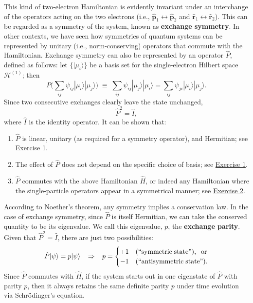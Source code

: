 \documentclass[pra,12pt]{revtex4}
\begin{document}
This kind of two-electron Hamiltonian is evidently invariant under an
interchange of the operators acting on the two electrons (i.e.,
$\hat{\mathbf{p}}_1 \leftrightarrow \hat{\mathbf{p}}_2$ and
$\hat{\mathbf{r}}_1 \leftrightarrow \hat{\mathbf{r}}_2$).  This can be
regarded as a symmetry of the system, known as \textbf{exchange
  symmetry}.  In other contexts, we have seen how symmetries of
quantum systems can be represented by unitary (i.e., norm-conserving)
operators that commute with the Hamiltonian.  Exchange symmetry can
also be represented by an operator $\hat{P}$, defined as follows: let
$\{|\mu_i\rangle\}$ be a basis set for the single-electron Hilbert
space $\mathscr{H}^{(1)}$; then
$$P \Big (\sum_{ij} \psi_{ij} |\mu_i\rangle|\mu_j\rangle \Big)
\;\equiv\;  \sum_{ij} \psi_{ij} |\mu_j\rangle|\mu_i\rangle = \sum_{ij} \psi_{ji} |\mu_i\rangle|\mu_j\rangle.$$
Since two consecutive exchanges clearly leave the state unchanged,
$$\hat{P}^2 = \hat{I},$$
where $\hat{I}$ is the identity operator.  It can be shown that:
\begin{enumerate}
\item $\hat{P}$ is linear, unitary (as required for a symmetry
  operator), and Hermitian; see \hyperref[ex:1]{Exercise 1}.
  
\item The effect of $\hat{P}$ does not depend on the specific choice
  of basis; see \hyperref[ex:1]{Exercise 1}.

\item $\hat{P}$ commutes with the above Hamiltonian $\hat{H}$, or
  indeed any Hamiltonian where the single-particle operators appear in
  a symmetrical manner; see \hyperref[ex:2]{Exercise 2}.
\end{enumerate}

According to Noether's theorem, any symmetry implies a conservation
law.  In the case of exchange symmetry, since $\hat{P}$ is itself
Hermitian, we can take the conserved quantity to be its eigenvalue.
We call this eigenvalue, $p$, the \textbf{exchange parity}.  Given
that $\hat{P}^2 = \hat{I}$, there are just two possibilities:
$$\hat{P} |\psi\rangle = p|\psi\rangle \;\;\;\Rightarrow\;\;\; p = \begin{cases}+1 & \textrm{(``symmetric\;state'')}, \;\;\textrm{or} \\ -1 & \textrm{(``antisymmetric\;state'').}\end{cases}$$
Since $\hat{P}$ commutes with $\hat{H}$, if the system starts out in
one eigenstate of $\hat{P}$ with parity $p$, then it always retains
the same definite parity $p$ under time evolution via Schr\"odinger's
equation.
\end{document}
